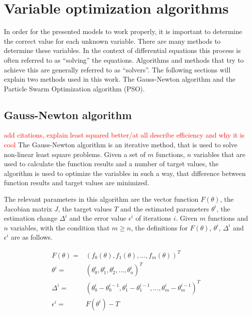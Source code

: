 
\section{Variable optimization algorithms}
In order for the presented models to work properly, it is important to determine the correct value for each unknown variable. There are many
methods to determine these variables. In the context of differential equations this process is often referred to as ``solving'' the equations.
Algorithms and methods that try to achieve this are generally referred to as ``solvers''.
The following sections will explain two methods used in this work. The Gauss-Newton algorithm and the Particle Swarm Optimization algorithm (PSO).


\subsection{Gauss-Newton algorithm}
\textcolor{red}{add citations, explain least squared better/at all}
\textcolor{red}{describe efficiency and why it is cool}
\label{sec:Gauss}
The Gauss-Newton algorithm is an iterative method, that is used to solve non-linear least square problems. Given a set of $m$ functions, $n$
variables that are used to calculate the function results  and a number of target values, the algorithm is used to optimize the variables in
such a way, that difference between function results and target values are minimized.\newline

The relevant parameters in this algorithm are the vector function $F(\theta)$, the Jacobian matrix $J$, the target values $T$ and the
estimated parameters $\theta^{i}$, the estimation change $\Delta^{i}$ and the error value $\epsilon^{i}$ of iterations $i$. Given $m$
functions and $n$ variables, with the condition that $m \geq n$, the definitions for $F(\theta)$, $\theta^{i}$, $\Delta^{i}$ and
$\epsilon^{i}$ are as follows.

\begin{align}
	F(\theta) =& (f_0(\theta), f_1(\theta),...,f_m(\theta))^T \\
	\theta^{i} =& (\theta^{i}_0, \theta^{i}_1, \theta^{i}_2,...,\theta^{i}_n)^T \\
	\Delta^{i} =& (\theta^{i}_0 - \theta^{i-1}_0, \theta^{i}_1 - \theta^{i-1}_1, ..., \theta^{i}_m - \theta^{i-1}_m)^T \\ %
	\epsilon^{i} =& F(\theta^{i}) - T
\end{align}

